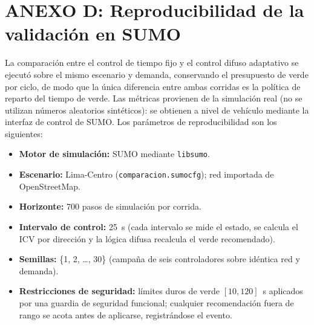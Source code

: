 \section*{ANEXO D: Reproducibilidad de la validación en SUMO}
\label{anexo:sumo}

La comparación entre el control de tiempo fijo y el control difuso adaptativo se ejecutó sobre el mismo
escenario y demanda, conservando el presupuesto de verde por ciclo, de modo que la única diferencia entre
ambas corridas es la política de reparto del tiempo de verde. Las métricas provienen de la simulación real
(no se utilizan números aleatorios sintéticos): se obtienen a nivel de vehículo mediante la interfaz de
control de SUMO. Los parámetros de reproducibilidad son los siguientes:

\begin{itemize}
\item \textbf{Motor de simulación:} SUMO mediante \texttt{libsumo}.
\item \textbf{Escenario:} Lima-Centro (\texttt{comparacion.sumocfg}); red importada de OpenStreetMap.
\item \textbf{Horizonte:} 700 pasos de simulación por corrida.
\item \textbf{Intervalo de control:} 25~s (cada intervalo se mide el estado, se calcula el ICV por
dirección y la lógica difusa recalcula el verde recomendado).
\item \textbf{Semillas:} \{1, 2, \ldots, 30\} (campaña de seis controladores sobre idéntica red y demanda).
\item \textbf{Restricciones de seguridad:} límites duros de verde $[10, 120]$~s aplicados por una guardia de
seguridad funcional; cualquier recomendación fuera de rango se acota antes de aplicarse, registrándose el
evento.
\end{itemize}

